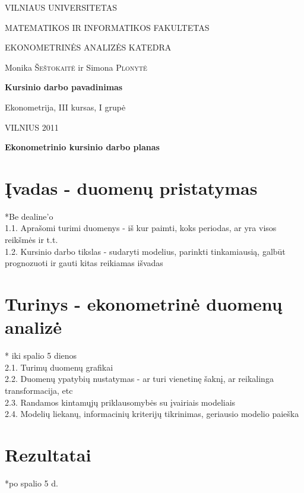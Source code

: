 \documentclass[a4paper]{article}
\begin{document}
\begin{titlepage}
\centerline{ \large VILNIAUS UNIVERSITETAS}
\bigskip
\centerline{\large MATEMATIKOS IR INFORMATIKOS FAKULTETAS}
\smallskip

\centerline{\large  EKONOMETRINĖS ANALIZĖS KATEDRA}
\vskip 200pt
\centerline{ \large Monika \textsc{Šeštokaitė} ir \large Simona \textsc{Plonytė}}
\vskip 50pt
\centerline{\bf \Large Kursinio darbo pavadinimas}
\bigskip
\vskip 50pt
\hfill Ekonometrija, III kursas, I grupė
\vskip 100pt
\centerline{\large VILNIUS 2011}
\end{titlepage}

\pagebreak

\centerline{\bf \Large Ekonometrinio kursinio darbo planas}
\section{ Įvadas - duomenų pristatymas}

*Be dealine'o \\

	1.1. Aprašomi turimi duomenys - iš kur paimti, koks periodas, ar yra visos reikšmės ir t.t. \\

	1.2. Kursinio darbo tikslas - sudaryti modelius, parinkti tinkamiausią, galbūt prognozuoti ir gauti kitas reikiamas išvadas

\section{ Turinys - ekonometrinė duomenų analizė} 
* iki spalio 5 dienos \\

	2.1. Turimų duomenų grafikai\\

	2.2. Duomenų ypatybių nustatymas - ar turi vienetinę šaknį, ar reikalinga transformacija, etc\\

	2.3. Randamos kintamųjų priklausomybės su įvairiais modeliais\\

	2.4. Modelių liekanų, informacinių kriterijų tikrinimas, geriausio modelio paieška\\

\section{Rezultatai}
*po spalio 5 d.\\
\end{document}
